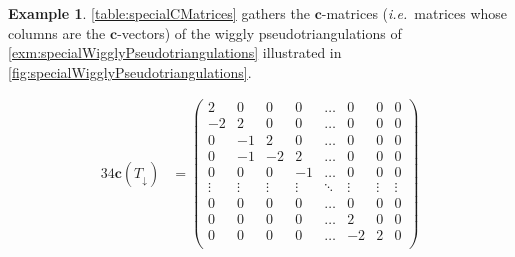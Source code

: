 \documentclass{amsart}
\theoremstyle{definition}
\newtheorem{example}[theorem]{Example}
\renewcommand{\b}[1]{{\boldsymbol{#1}}} %
\newcommand{\ie}{\textit{i.e.}~} %
\begin{document}
\begin{example}
\label{exm:specialCMatrices}
\cref{table:specialCMatrices} gathers the $\b{c}$-matrices (\ie matrices whose columns are the $\b{c}$-vectors) of the wiggly pseudotriangulations of \cref{exm:specialWigglyPseudotriangulations} illustrated in \cref{fig:specialWigglyPseudotriangulations}.

\begin{table}
	\begingroup
	\fontsize{10}{10}\selectfont
	\setlength\arraycolsep{2pt}
	\begin{alignat*}{3}
	4\b{c}(T_\downarrow) & = \begin{pmatrix}
		2 & 0 & 0 & 0 & \dots & 0 & 0 & 0 \\
		-2 & 2 & 0 & 0 & \dots & 0 & 0 & 0 \\
		0 & -1 & 2 & 0 & \dots & 0 & 0 & 0 \\
		0 & -1 & -2 & 2 & \dots & 0 & 0 & 0 \\
		0 & 0 & 0 & -1 & \dots & 0 & 0 & 0 \\
		\vdots & \vdots & \vdots & \vdots & \ddots & \vdots & \vdots & \vdots \\
		0 & 0 & 0 & 0 & \dots & 0 & 0 & 0 \\
		0 & 0 & 0& 0 & \dots & 2 & 0 & 0 \\
		0 & 0 & 0 & 0 & \dots & -2 & 2 & 0 \\

\end{pmatrix}
\end{alignat*}
\end{table}
\end{example}
\end{document}
